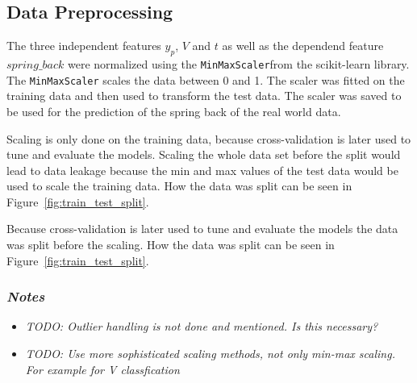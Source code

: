 
\subsection{Data Preprocessing}\label{subsec:data-preprocessing}

The three independent features $y_p$, $V$ and $t$ as well as the dependend feature $spring\_back$
were normalized
using the \texttt{MinMaxScaler}from the scikit-learn library. The \texttt{MinMaxScaler} scales
the data between 0 and
1. The scaler was fitted on the training data and then used to transform the test data. The
scaler was saved to be
used for the prediction of the spring back of the real world data.

Scaling is only done on the training data, because cross-validation is later used to tune and
evaluate the models.
Scaling the whole data set before the split would lead to data leakage because the min and max
values of the test
data would be used to scale the training data.
How the data was split can be seen in Figure~\ref{fig:train_test_split}.

Because cross-validation is later used to tune and evaluate the models the data was split before
the scaling. How the
data was split can be seen in Figure~\ref{fig:train_test_split}.

\subsubsection*{\textit{Notes}}
\begin{itemize}
    \item \textit{TODO: Outlier handling is not done and mentioned. Is this necessary?}
    \item \textit{TODO: Use more sophisticated scaling methods, not only min-max scaling. For
    example for V
    classfication}
\end{itemize}


